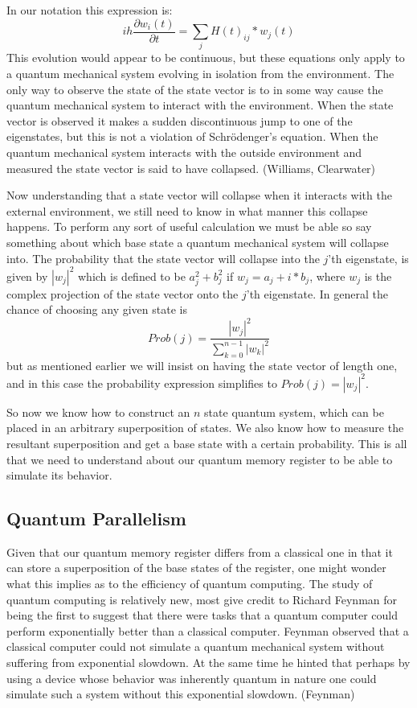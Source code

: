 \documentclass[]{article}
\begin{document}
In our notation this expression is:
	\[ih\frac{\partial w_{i}(t)}{\partial t} = \sum_{j}H(t)_{ij} * w_{j}(t)\]
This evolution would appear to be continuous, but these equations only
apply to a quantum mechanical system evolving in isolation from the
environment.  The only way to observe the state of the state vector is
to in some way cause the quantum mechanical system to interact with
the environment.  When the state vector is observed it makes a sudden
discontinuous jump to one of the eigenstates, but this is not a
violation of Schr\"{o}denger's equation.  When the quantum mechanical
system interacts with the outside environment and measured the state
vector is said to have collapsed.  (Williams, Clearwater)

Now understanding that a state vector will collapse when it interacts
with the external environment, we still need to know in what manner
this collapse happens. To perform any sort of useful calculation we
must be able so say something about which base state a quantum
mechanical system will collapse into. The probability that the state
vector will collapse into the $j$'th eigenstate, is given by
$|w_{j}|^{2}$ which is defined to be $a_{j}^{2} + b_{j}^{2}$ if $w_{j}
= a_{j} + i*b_{j}$, where $w_{j}$ is the complex projection of the
state vector onto the $j$'th eigenstate. In general the chance of
choosing any given state is
\[Prob(j) = \frac{|w_{j}|^{2}}{\sum_{k = 0}^{ n-1} |w_{k}|^{2}}\] but
as mentioned earlier we will insist on having the state vector of
length one, and in this case the probability expression simplifies to
$Prob(j) = |w_{j}|^{2}$.

So now we know how to construct an $n$ state quantum system, which can
be placed in an arbitrary superposition of states.  We also know how
to measure the resultant superposition and get a base state with a
certain probability.  This is all that we need to understand about our
quantum memory register to be able to simulate its behavior.

\subsection{Quantum Parallelism}

Given that our quantum memory register differs from a classical one in
that it can store a superposition of the base states of the register,
one might wonder what this implies as to the efficiency of quantum
computing.  The study of quantum computing is relatively new, most
give credit to Richard Feynman for being the first to suggest that
there were tasks that a quantum computer could perform exponentially
better than a classical computer.  Feynman observed that a classical
computer could not simulate a quantum mechanical system without
suffering from exponential slowdown.  At the same time he hinted that
perhaps by using a device whose behavior was inherently quantum in
nature one could simulate such a system without this exponential
slowdown.  (Feynman)
\end{document}
